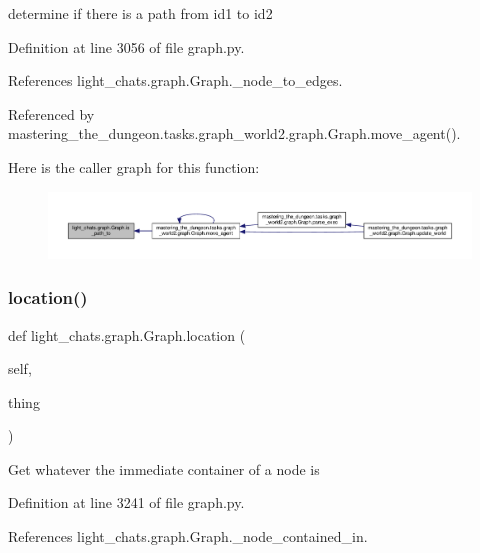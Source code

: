 \begin{DoxyVerb}determine if there is a path from id1 to id2\end{DoxyVerb}
 

Definition at line 3056 of file graph.\+py.



References light\+\_\+chats.\+graph.\+Graph.\+\_\+node\+\_\+to\+\_\+edges.



Referenced by mastering\+\_\+the\+\_\+dungeon.\+tasks.\+graph\+\_\+world2.\+graph.\+Graph.\+move\+\_\+agent().

Here is the caller graph for this function\+:
\nopagebreak
\begin{figure}[H]
\begin{center}
\leavevmode
\includegraphics[width=350pt]{classlight__chats_1_1graph_1_1Graph_a04cfd7a5cc3c2df0c1bfec920d89d84c_icgraph}
\end{center}
\end{figure}
\mbox{\label{classlight__chats_1_1graph_1_1Graph_a33bf40491bd3aa15e65987377b3d580f}} 
\subsubsection{\texorpdfstring{location()}{location()}}
{\footnotesize\ttfamily def light\+\_\+chats.\+graph.\+Graph.\+location (\begin{DoxyParamCaption}\item[{}]{self,  }\item[{}]{thing }\end{DoxyParamCaption})}

\begin{DoxyVerb}Get whatever the immediate container of a node is\end{DoxyVerb}
 

Definition at line 3241 of file graph.\+py.



References light\+\_\+chats.\+graph.\+Graph.\+\_\+node\+\_\+contained\+\_\+in.



